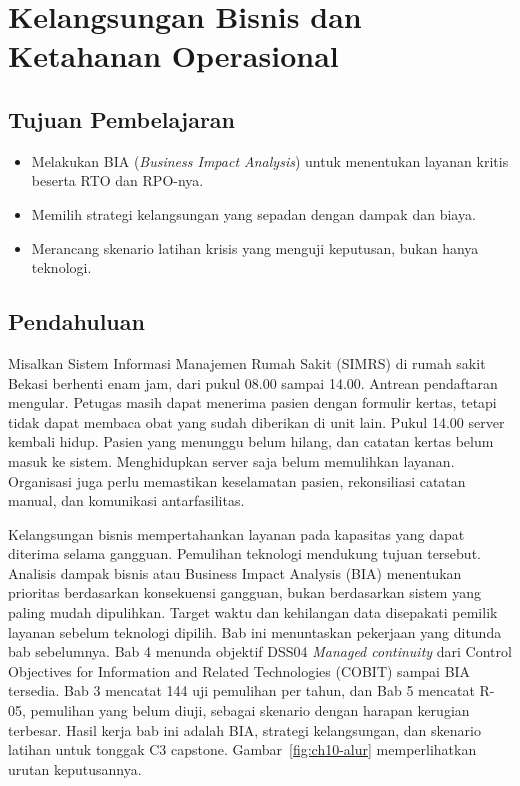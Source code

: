 \chapter{Kelangsungan Bisnis dan Ketahanan Operasional}

\section*{Tujuan Pembelajaran}
\begin{itemize}
  \item Melakukan BIA (\textit{Business Impact Analysis}) untuk menentukan layanan kritis
  beserta RTO dan RPO-nya.
  \item Memilih strategi kelangsungan yang sepadan dengan dampak dan biaya.
  \item Merancang skenario latihan krisis yang menguji keputusan, bukan hanya teknologi.
\end{itemize}

\section{Pendahuluan}

Misalkan Sistem Informasi Manajemen Rumah Sakit (SIMRS) di rumah sakit Bekasi berhenti enam
jam, dari pukul 08.00 sampai 14.00. Antrean pendaftaran mengular. Petugas masih dapat menerima
pasien dengan formulir kertas, tetapi tidak dapat membaca obat yang sudah diberikan di unit
lain. Pukul 14.00 server kembali hidup. Pasien yang menunggu belum hilang, dan catatan kertas
belum masuk ke sistem. Menghidupkan server saja belum memulihkan layanan. Organisasi juga perlu
memastikan keselamatan pasien, rekonsiliasi catatan manual, dan komunikasi antarfasilitas.

Kelangsungan bisnis mempertahankan layanan pada kapasitas yang dapat diterima selama gangguan.
Pemulihan teknologi mendukung tujuan tersebut. Analisis dampak bisnis atau Business Impact
Analysis (BIA) menentukan prioritas berdasarkan konsekuensi gangguan, bukan berdasarkan sistem
yang paling mudah dipulihkan. Target waktu dan kehilangan data disepakati pemilik layanan
sebelum teknologi dipilih. Bab ini menuntaskan pekerjaan yang ditunda bab sebelumnya. Bab 4
menunda objektif DSS04 \textit{Managed continuity} dari Control Objectives for Information and
Related Technologies (COBIT) sampai BIA tersedia. Bab 3 mencatat 144 uji pemulihan per tahun,
dan Bab 5 mencatat R-05, pemulihan yang belum diuji, sebagai skenario dengan harapan kerugian
terbesar. Hasil kerja bab ini adalah BIA, strategi kelangsungan, dan skenario latihan untuk
tonggak C3 capstone. Gambar~\ref{fig:ch10-alur} memperlihatkan urutan keputusannya.

